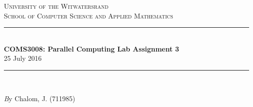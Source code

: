 \documentclass[11pt]{article}
\begin{document}
\begin{page}
\thispagestyle{empty}

\newcommand{\HRule}{\rule{\linewidth}{0.3mm}} %
\renewcommand\section{\@startsection{section}{1}{\z@}%
                                  {-3.5ex \@plus -1ex \@minus -.2ex}%
                                  {2.3ex \@plus.2ex}%
                                  {\normalfont\large\bfseries}}
\setlength{\parindent}{0pt}

\center %
 

\textsc{\LARGE University of the Witwatersrand}\\[1.5cm] %
\textsc{\Large School of Computer Science and Applied Mathematics}\\[0.5cm] %


\HRule \\[0.4cm]
{ \huge \bfseries COMS3008: Parallel Computing Lab Assignment 3}\\[0.4cm] %
  \large 25 July 2016
\HRule \\[1.5cm]
 
\begin{minipage}{1\textwidth}
  \Large \emph By Chalom, J. (711985)\\
\end{minipage}


\vfill %

\end{page}
\end{document}
